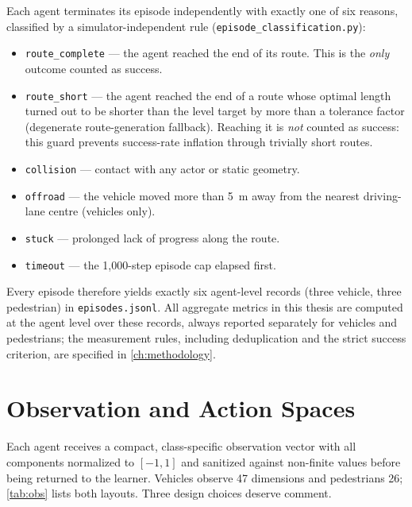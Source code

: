 Each agent terminates its episode independently with exactly one of six
reasons, classified by a simulator-independent rule
(\texttt{episode\_classification.py}):

\begin{itemize}
  \item \texttt{route\_complete} --- the agent reached the end of its
        route. This is the \emph{only} outcome counted as success.
  \item \texttt{route\_short} --- the agent reached the end of a route
        whose optimal length turned out to be shorter than the level target
        by more than a tolerance factor (degenerate route-generation
        fallback). Reaching it is \emph{not} counted as success: this guard
        prevents success-rate inflation through trivially short routes.
  \item \texttt{collision} --- contact with any actor or static geometry.
  \item \texttt{offroad} --- the vehicle moved more than \SI{5}{m} away
        from the nearest driving-lane centre (vehicles only).
  \item \texttt{stuck} --- prolonged lack of progress along the route.
  \item \texttt{timeout} --- the 1{,}000-step episode cap elapsed first.
\end{itemize}

Every episode therefore yields exactly six agent-level records (three
vehicle, three pedestrian) in \texttt{episodes.jsonl}. All aggregate
metrics in this thesis are computed at the agent level over these records,
always reported separately for vehicles and pedestrians; the measurement
rules, including deduplication and the strict success criterion, are
specified in \cref{ch:methodology}.

\section{Observation and Action Spaces}
\label{sec:obs-actions}

Each agent receives a compact, class-specific observation vector with all
components normalized to $[-1, 1]$ and sanitized against non-finite values
before being returned to the learner. Vehicles observe 47 dimensions and
pedestrians 26; \cref{tab:obs} lists both layouts. Three design choices
deserve comment.

